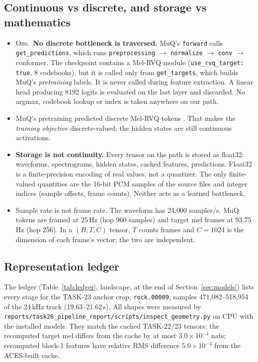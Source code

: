 \documentclass[10pt,letterpaper]{article}
\newcommand{\src}[1]{\nolinkurl{#1}}
\newcommand{\obs}{\textsc{Obs.}}
\begin{document}
\subsection{Continuous vs discrete, and storage vs mathematics}
\label{sec:discrete}
\begin{itemize}
\item \obs\ \textbf{No discrete bottleneck is traversed.} MuQ's \texttt{forward} calls \texttt{get\_predictions}, which runs \texttt{preprocessing} $\to$ \texttt{normalize} $\to$ \texttt{conv} $\to$ conformer. The checkpoint contains a Mel-RVQ module (\texttt{use\_rvq\_target: true}, 8 codebooks), but it is called only from \texttt{get\_targets}, which builds MuQ's \emph{pretraining} labels. It is never called during feature extraction. A linear head producing 8192 logits is evaluated on the last layer and discarded. No argmax, codebook lookup or index is taken anywhere on our path.
\item MuQ's pretraining predicted discrete Mel-RVQ tokens \citep{zhu2025muq}. That makes the \emph{training objective} discrete-valued; the hidden states are still continuous activations.
\item \textbf{Storage is not continuity.} Every tensor on the path is stored as float32: waveforms, spectrograms, hidden states, cached features, predictions. Float32 is a finite-precision encoding of real values, not a quantizer. The only finite-valued quantities are the 16-bit PCM samples of the source files and integer indices (sample offsets, frame counts). Neither acts as a learned bottleneck.
\item Sample rate is not frame rate. The waveform has 24{,}000 samples/s. MuQ tokens are framed at 25\,Hz (hop 960 samples) and target mel frames at 93.75\,Hz (hop 256). In a $(B,T,C)$ tensor, $T$ counts frames and $C{=}1024$ is the dimension of each frame's vector; the two are independent.
\end{itemize}

\subsection{Representation ledger}
The ledger (Table~\ref{tab:ledger}, landscape, at the end of Section~\ref{sec:models}) lists every stage for the TASK-23 anchor crop, \texttt{rock.00009}, samples 471{,}082--518{,}954 of the 24\,kHz track (19.63--21.62\,s). All shapes were measured by \src{reports/task26_pipeline_report/scripts/inspect_geometry.py} on CPU with the installed models. They match the cached TASK-22/23 tensors: the recomputed target mel differs from the cache by at most $3.0{\times}10^{-4}$ nats; recomputed block-1 features have relative RMS difference $5.0{\times}10^{-4}$ from the ACES-built cache.
\end{document}
